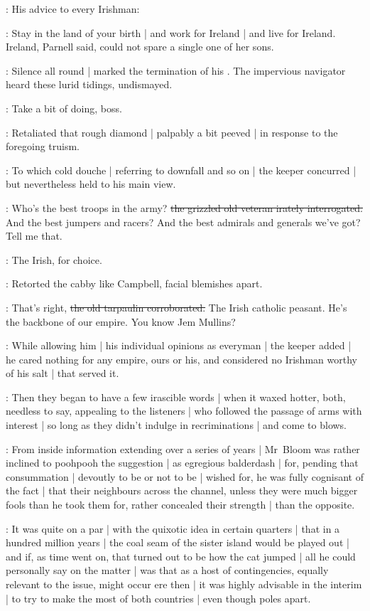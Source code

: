 :
His advice to every Irishman:

\SkinTheGoat:
Stay in the land of your birth |
and work for Ireland |
and live for Ireland.
Ireland,
Parnell said,
could not spare a single one of her sons.

:
Silence all round |
marked the termination of his .%
The impervious navigator heard these lurid tidings,
undismayed.

\Murphy:
Take a bit of doing,
boss.

:
Retaliated that rough diamond |
palpably a bit peeved |
in response to the foregoing truism.

:
To which cold douche |
referring to downfall and so on |
the keeper concurred |
but nevertheless held to his main view.

\SkinTheGoat:
Who's the best troops in the army?
\sout{the grizzled old veteran irately interrogated.}
And the best jumpers and racers?
And the best admirals and generals we've got?
Tell me that.

\Campbell:
The Irish,
for choice.%

:
Retorted the cabby like Campbell,
facial blemishes apart.

\Murphy:
That's right,
\sout{the old tarpaulin corroborated.}
The Irish catholic peasant.
He's the backbone of our empire.
You know Jem Mullins?

:
While allowing him |
his individual opinions as everyman |
the keeper added |
he cared nothing for any empire,
ours or his,
and considered no Irishman worthy of his salt |
that served it.

:
Then they began to have a few irascible words |
when it waxed hotter,
both,
needless to say,
appealing to the listeners |
who followed the passage of arms with interest |
so long as they didn't indulge in recriminations |
and come to blows.

:
From inside information extending over a series of years |
Mr~Bloom was rather inclined to poohpooh the suggestion |
as egregious balderdash |
for,
pending that consummation |
devoutly to be or not to be |
wished for,
he was fully cognisant of the fact |
that their neighbours across the channel,
unless they were much bigger fools than he took them for,
rather concealed their strength |
than the opposite.

:
It was quite on a par |
with the quixotic idea in certain quarters |
that in a hundred million years |
the coal seam of the sister island would be played out |
and if,
as time went on,
that turned out to be how the cat jumped |
all he could personally say on the matter |
was that as a host of contingencies,
equally relevant to the issue,
might occur ere then |
it was highly advisable in the interim |
to try to make the most of both countries |
even though poles apart.%

